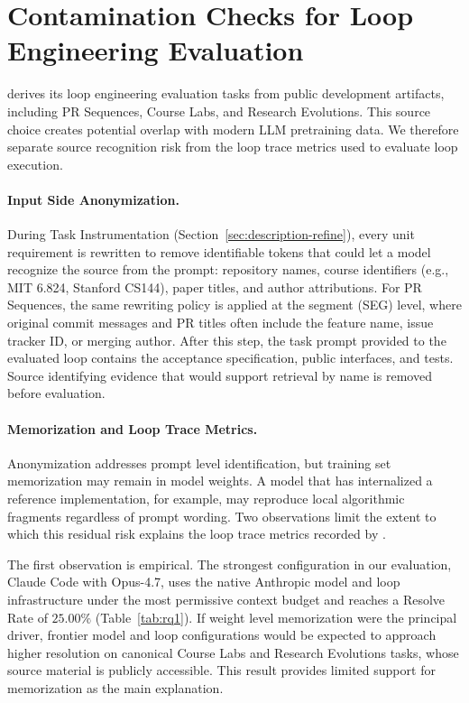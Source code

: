 \section{Contamination Checks for Loop Engineering Evaluation}\label{app:contamination}

\lhb{} derives its loop engineering evaluation tasks from public development artifacts, including PR Sequences, Course Labs, and Research Evolutions. This source choice creates potential overlap with modern LLM pretraining data. We therefore separate source recognition risk from the loop trace metrics used to evaluate loop execution.

\paragraph{Input Side Anonymization.}
During Task Instrumentation (Section~\ref{sec:description-refine}), every unit requirement is rewritten to remove identifiable tokens that could let a model recognize the source from the prompt: repository names, course identifiers (e.g., MIT 6.824, Stanford CS144), paper titles, and author attributions. For PR Sequences, the same rewriting policy is applied at the segment (SEG) level, where original commit messages and PR titles often include the feature name, issue tracker ID, or merging author. After this step, the task prompt provided to the evaluated loop contains the acceptance specification, public interfaces, and tests. Source identifying evidence that would support retrieval by name is removed before evaluation.

\paragraph{Memorization and Loop Trace Metrics.}

Anonymization addresses prompt level identification, but training set memorization may remain in model weights. A model that has internalized a reference implementation, for example, may reproduce local algorithmic fragments regardless of prompt wording. Two observations limit the extent to which this residual risk explains the loop trace metrics recorded by \lhb{}.

The first observation is empirical. The strongest configuration in our evaluation, Claude Code with Opus-4.7, uses the native Anthropic model and loop infrastructure under the most permissive context budget and reaches a Resolve Rate of $25.00\%$ (Table~\ref{tab:rq1}). If weight level memorization were the principal driver, frontier model and loop configurations would be expected to approach higher resolution on canonical Course Labs and Research Evolutions tasks, whose source material is publicly accessible. This result provides limited support for memorization as the main explanation.

